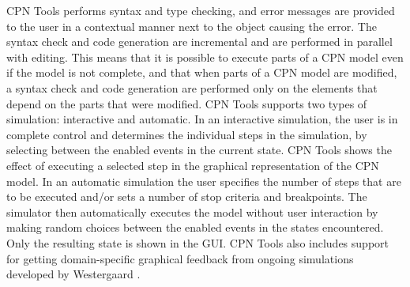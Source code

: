 CPN Tools performs syntax and type checking, and error messages are
provided to the user in a contextual manner next to the object causing
the error. The syntax check and code generation are incremental and
are performed in parallel with editing. This means that it is possible
to execute parts of a CPN model even if the model is not complete, and
that when parts of a CPN model are modified, a syntax check and code
generation are performed only on the elements that depend on the parts
that were modified. CPN Tools supports two types of simulation:
interactive and automatic. In an interactive simulation, the user is
in complete control and determines the individual steps in the
simulation, by selecting between the enabled events in the current
state. CPN Tools shows the effect of executing a selected step in the
graphical representation of the CPN model. In an automatic simulation
the user specifies the number of steps that are to be executed and/or
sets a number of stop criteria and breakpoints. The simulator then
automatically executes the model without user interaction by making
random choices between the enabled events in the states
encountered. Only the resulting state is shown in the GUI. CPN Tools
also includes support for getting domain-specific graphical feedback
from ongoing simulations developed by Westergaard \cite{X}.






